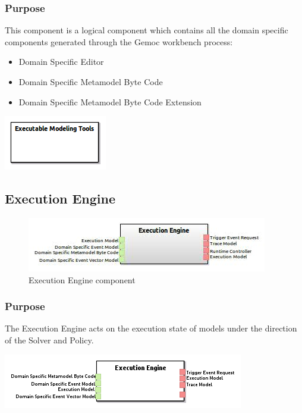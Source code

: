 \documentclass{gemoc} %
\begin{document}
\subsubsection{Purpose}
This component is a logical component which contains all the domain specific components generated through the Gemoc workbench process:  
\begin{itemize}
\item Domain Specific Editor
\item Domain Specific Metamodel Byte Code
\item Domain Specific Metamodel Byte Code Extension
\end{itemize}
\begin{center}
\includegraphics*[trim=0.0cm 0.0cm 0cm 0.0cm, clip=true]{../images/generated/Generated_Executable_Modeling_Tools.png}
\end{center}



\subsection{Execution Engine}

\begin{figure}[htp]
	\begin{center}
	\includegraphics*[trim=0.0cm 0.0cm 0cm 0.0cm, clip=true, scale=1.0]{../images/generated/Generated_Execution Engine.jpg}
	\caption{Execution Engine component}
	\end{center}
\end{figure}

\subsubsection{Purpose}
The Execution Engine acts on the execution state of models under the direction of the Solver and Policy.
\begin{center}
\includegraphics*[trim=0.0cm 0.0cm 0cm 0.0cm, clip=true]{../images/generated/Generated_Execution_Engine.png}
\end{center}
\end{document}
